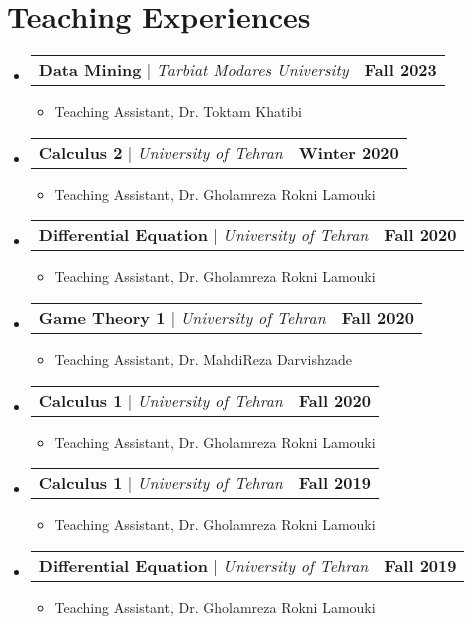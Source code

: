 \documentclass[letterpaper,11pt]{article}
\makeatletter
\newcommand{\resumeItem}[1]{
  \item\small{
    {#1 \vspace{-2pt}}
  }
}
\newcommand{\resumeProjectHeading}[2]{
    \item
    \begin{tabular*}{1.001\textwidth}{l@{\extracolsep{\fill}}r}
      \small#1 & \textbf{\small #2}\\
    \end{tabular*}\vspace{-7pt}
}
\newcommand{\resumeSubHeadingListStart}{\begin{itemize}[leftmargin=0.0in, label={}]}
\newcommand{\resumeSubHeadingListEnd}{\end{itemize}}
\newcommand{\resumeItemListStart}{\begin{itemize}}
\newcommand{\resumeItemListEnd}{\end{itemize}\vspace{-5pt}}
\makeatother
\begin{document}
\section{Teaching Experiences}
    \resumeSubHeadingListStart
        \resumeProjectHeading
            {\textbf{Data Mining} $|$ \emph{Tarbiat Modares University}}{Fall 2023}
            \resumeItemListStart
                \resumeItem{Teaching Assistant, Dr. Toktam Khatibi}
            \resumeItemListEnd
            \vspace{-13pt}
        \resumeProjectHeading
            {\textbf{Calculus 2} $|$ \emph{University of Tehran}}{Winter 2020}
            \resumeItemListStart
                \resumeItem{Teaching Assistant, Dr. Gholamreza Rokni Lamouki}
            \resumeItemListEnd
            \vspace{-13pt}
        \resumeProjectHeading
            {\textbf{Differential Equation} $|$ \emph{University of Tehran}}{Fall 2020}
            \resumeItemListStart
                \resumeItem{Teaching Assistant, Dr. Gholamreza Rokni Lamouki}
            \resumeItemListEnd
            \vspace{-13pt}
        \resumeProjectHeading
            {\textbf{Game Theory 1} $|$ \emph{University of Tehran}}{Fall 2020}
            \resumeItemListStart
                \resumeItem{Teaching Assistant, Dr. MahdiReza Darvishzade}
            \resumeItemListEnd
            \vspace{-13pt}
        \resumeProjectHeading
            {\textbf{Calculus 1} $|$ \emph{University of Tehran}}{Fall 2020}
            \resumeItemListStart
                \resumeItem{Teaching Assistant, Dr. Gholamreza Rokni Lamouki}
            \resumeItemListEnd
            \vspace{-13pt}
        \resumeProjectHeading
            {\textbf{Calculus 1} $|$ \emph{University of Tehran}}{Fall 2019}
            \resumeItemListStart
                \resumeItem{Teaching Assistant, Dr. Gholamreza Rokni Lamouki}
            \resumeItemListEnd
            \vspace{-13pt}
        \resumeProjectHeading
            {\textbf{Differential Equation} $|$ \emph{University of Tehran}}{Fall 2019}
            \resumeItemListStart
                \resumeItem{Teaching Assistant, Dr. Gholamreza Rokni Lamouki}
            \resumeItemListEnd
            \vspace{-13pt}
    \resumeSubHeadingListEnd

\vspace{-5pt}
%
\end{document}
